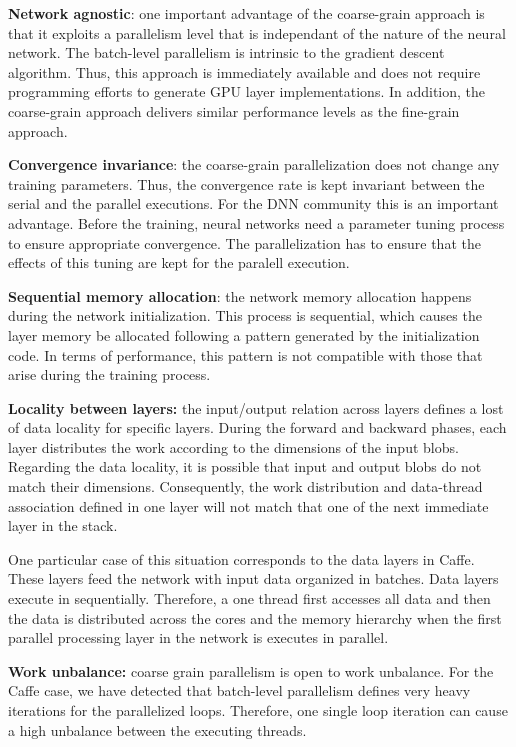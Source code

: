 \textbf{Network agnostic}: one important advantage of the coarse-grain 
approach is that it exploits a parallelism level that is independant of 
the nature of the neural network. The batch-level parallelism is 
intrinsic to the gradient descent algorithm. Thus, this approach is 
immediately available and does not require programming efforts to generate 
GPU layer implementations. In addition, the coarse-grain approach 
delivers similar performance levels as the fine-grain approach. 

\textbf{Convergence invariance}: the coarse-grain parallelization does not 
change any training parameters. Thus, the convergence rate is kept 
invariant between the serial and the parallel executions. 
For the DNN community this is an important advantage. Before 
the training, neural networks need a parameter tuning process to ensure 
appropriate convergence. The parallelization has to ensure that the effects of this tuning are kept for the paralell execution.

\textbf{Sequential memory allocation}: the network memory allocation
happens during the network initialization. This process is sequential, 
which causes the layer memory be allocated following a
pattern generated by the initialization code. In terms of performance, 
this pattern is not compatible with those that arise during
the training process.

\textbf{Locality between layers:} the input/output relation across layers
defines a lost of data locality for specific layers. During the forward 
and backward phases, each layer distributes the work according to the 
dimensions of the input blobs. Regarding the data locality, it is 
possible that input and output blobs do not match
their dimensions. Consequently, the work distribution and data-thread
association defined in one layer will not match that one of the
next immediate layer in the stack.

One particular case of this situation corresponds to the data
layers in Caffe. These layers feed the network with input data
organized in batches. Data layers execute in sequentially.
Therefore, a one thread first accesses all data and then the data is
distributed across the cores and the memory hierarchy when the
first parallel processing layer in the network is executes in parallel. 

\textbf{Work unbalance:} coarse grain parallelism is open to work unbalance. 
For the Caffe case, we have detected that batch-level parallelism 
defines very heavy iterations for the parallelized loops.
Therefore, one single loop iteration can cause a high unbalance
between the executing threads. 

